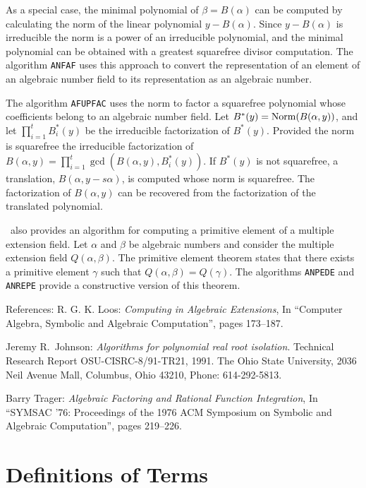 As a special
case, the minimal polynomial of $\beta = B(\alpha)$ can be computed by
calculating the norm of the linear polynomial $y-B(\alpha)$.  Since 
$y-B(\alpha)$ is irreducible 
the norm is a power of an irreducible polynomial, and the minimal
polynomial can be obtained with a greatest squarefree divisor computation.
The algorithm {\tt ANFAF} uses this approach to convert the representation
of an element of an algebraic number field to its representation as an
algebraic number.

The algorithm {\tt AFUPFAC} uses the norm to factor a squarefree polynomial
whose coefficients belong to an algebraic number field.  Let 
$B^*(y) = {\rm Norm}(B(\alpha,y))$, and let $\prod_{i=1}^t B^*_i(y)$ be the
irreducible factorization of $B^*(y)$.
Provided the norm
is squarefree the irreducible factorization of $B(\alpha,y) =
\prod_{i=1}^t\gcd(B(\alpha,y),B^*_i(y))$.  If $B^*(y)$ is not squarefree,
a translation, $B(\alpha,y-s\alpha)$, is computed whose norm is squarefree.
The factorization of $B(\alpha,y)$ can be recovered from the factorization
of the translated polynomial.

\saclib\ also provides an algorithm for computing a primitive element
of a multiple extension field.  Let $\alpha$ and $\beta$ be algebraic
numbers and consider the multiple extension field $Q(\alpha,\beta)$.
The primitive element theorem states that there exists a primitive element
$\gamma$ such that $Q(\alpha,\beta) = Q(\gamma)$.  The algorithms
{\tt ANPEDE} and {\tt ANREPE} provide a constructive version of this theorem.

References:
%
R. G. K. Loos: {\it Computing in Algebraic Extensions},
In ``Computer Algebra, Symbolic and Algebraic Computation'',
pages 173--187.

Jeremy R.\ Johnson:
{\it Algorithms for polynomial real root isolation}.
Technical Research Report OSU-CISRC-8/91-TR21, 1991.
The Ohio State University,
2036 Neil Avenue Mall,
Columbus, Ohio 43210,
Phone: 614-292-5813.

Barry Trager: {\it Algebraic Factoring and Rational Function Integration},
In ``SYMSAC '76: Proceedings of the 1976 ACM Symposium on Symbolic and
Algebraic Computation'', pages 219--226.

%

\section{Definitions of Terms}

